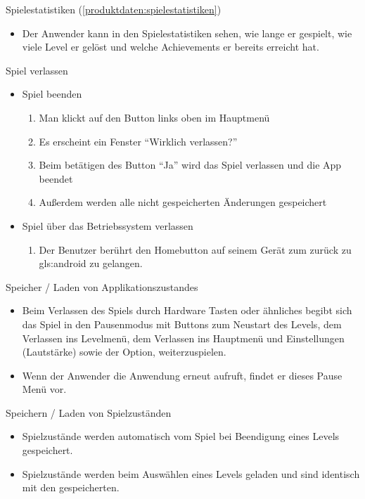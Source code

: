 \documentclass{scrartcl}
\begin{document}
\begin{telist}
	\item Spielestatistiken (\ref{produktdaten:spielestatistiken})
	\begin{itemize}
		\item Der Anwender kann in den Spielestatistiken sehen, wie lange er gespielt, wie viele Level er gelöst und welche Achievements er bereits erreicht hat.
	\end{itemize}
	
	\item{Spiel verlassen} \label{szenarien:quit_game}
	\begin{itemize}
		\item Spiel beenden
		\begin{enumerate}
			\item Man klickt auf den Button links oben im Hauptmenü
			\item Es erscheint ein Fenster \enquote{Wirklich verlassen?}
			\item Beim betätigen des Button \enquote{Ja} wird das Spiel verlassen und die App beendet
			\item Außerdem werden alle nicht gespeicherten Änderungen gespeichert
		\end{enumerate}
		\item Spiel über das Betriebssystem verlassen
		\begin{enumerate}
			\item Der Benutzer berührt den Homebutton auf seinem Gerät zum zurück zu \gls{gls:android} zu gelangen.
		\end{enumerate}
	\end{itemize}
	
	\item Speicher / Laden von Applikationszustandes
	\begin{itemize}
		\item Beim Verlassen des Spiels durch Hardware Tasten oder ähnliches begibt sich das Spiel in den Pausenmodus mit Buttons zum Neustart des Levels, dem Verlassen ins Levelmenü, dem Verlassen ins Hauptmenü und Einstellungen (Lautstärke) sowie der Option, weiterzuspielen.
		\item Wenn der Anwender die Anwendung erneut aufruft, findet er dieses Pause Menü vor.
	\end{itemize}
	
	\item Speichern / Laden von Spielzuständen
	\begin{itemize}
		\item Spielzustände werden automatisch vom Spiel bei Beendigung eines Levels gespeichert.
		\item Spielzustände werden beim Auswählen eines Levels geladen und sind identisch mit den gespeicherten.
	\end{itemize}
\end{telist}
\end{document}
